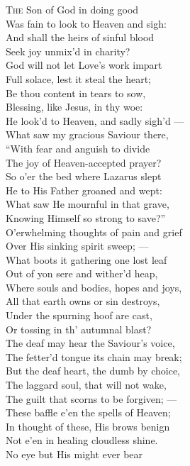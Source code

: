 \textsc{The} Son of God in doing good \\
 Was fain to look to Heaven and sigh: \\
 And shall the heirs of sinful blood \\
 Seek joy unmix’d in charity? \\
 God will not let Love’s work impart \\
 Full solace, lest it steal the heart; \\
 Be thou content in tears to sow, \\
 Blessing, like Jesus, in thy woe: \\
  He look’d to Heaven, and sadly sigh’d — \\
 What saw my gracious Saviour there, \\
 “With fear and anguish to divide \\
 The joy of Heaven-accepted prayer? \\
 So o’er the bed where Lazarus slept \\
 He to His Father groaned and wept: \\
 What saw He mournful in that grave, \\
 Knowing Himself so strong to save?” \\
  O’erwhelming thoughts of pain and grief \\
 Over His sinking spirit sweep; — \\
 What boots it gathering one lost leaf \\
 Out of yon sere and wither’d heap, \\
 Where souls and bodies, hopes and joys, \\
 All that earth owns or sin destroys, \\
 Under the spurning hoof are cast, \\
 Or tossing in th’ autumnal blast? \\
  The deaf may hear the Saviour’s voice, \\
 The fetter’d tongue its chain may break; \\
 But the deaf heart, the dumb by choice, \\
 The laggard soul, that will not wake, \\
 The guilt that scorns to be forgiven; — \\
 These baffle e’en the spells of Heaven; \\
 In thought of these, His brows benign \\
 Not e’en in healing cloudless shine. \\
  No eye but His might ever bear \\

